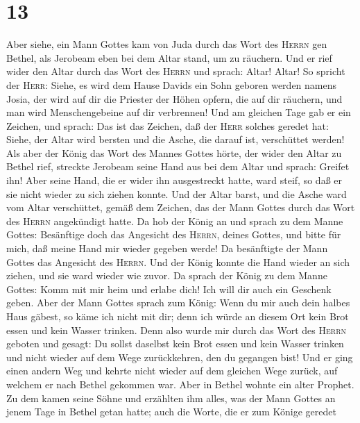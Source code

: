\hypertarget{section-12}{%
\section{13}\label{section-12}}

 Aber siehe, ein Mann Gottes kam von Juda durch das Wort
des \textsc{Herrn} gen Bethel, als Jerobeam eben bei dem Altar stand, um
zu räuchern.  Und er rief wider den Altar durch das Wort
des \textsc{Herrn} und sprach: Altar! Altar! So spricht der
\textsc{Herr}: Siehe, es wird dem Hause Davids ein Sohn geboren werden
namens Josia, der wird auf dir die Priester der Höhen opfern, die auf
dir räuchern, und man wird Menschengebeine auf dir verbrennen!
 Und am gleichen Tage gab er ein Zeichen, und sprach: Das
ist das Zeichen, daß der \textsc{Herr} solches geredet hat: Siehe, der
Altar wird bersten und die Asche, die darauf ist, verschüttet werden!
 Als aber der König das Wort des Mannes Gottes hörte, der
wider den Altar zu Bethel rief, streckte Jerobeam seine Hand aus bei dem
Altar und sprach: Greifet ihn! Aber seine Hand, die er wider ihn
ausgestreckt hatte, ward steif, so daß er sie nicht wieder zu sich
ziehen konnte.  Und der Altar barst, und die Asche ward
vom Altar verschüttet, gemäß dem Zeichen, das der Mann Gottes durch das
Wort des \textsc{Herrn} angekündigt hatte.  Da hob der
König an und sprach zu dem Manne Gottes: Besänftige doch das Angesicht
des \textsc{Herrn}, deines Gottes, und bitte für mich, daß meine Hand
mir wieder gegeben werde! Da besänftigte der Mann Gottes das Angesicht
des \textsc{Herrn}. Und der König konnte die Hand wieder an sich ziehen,
und sie ward wieder wie zuvor.  Da sprach der König zu dem
Manne Gottes: Komm mit mir heim und erlabe dich! Ich will dir auch ein
Geschenk geben.  Aber der Mann Gottes sprach zum König:
Wenn du mir auch dein halbes Haus gäbest, so käme ich nicht mit dir;
denn ich würde an diesem Ort kein Brot essen und kein Wasser trinken.
 Denn also wurde mir durch das Wort des \textsc{Herrn}
geboten und gesagt: Du sollst daselbst kein Brot essen und kein Wasser
trinken und nicht wieder auf dem Wege zurückkehren, den du gegangen
bist!  Und er ging einen andern Weg und kehrte nicht
wieder auf dem gleichen Wege zurück, auf welchem er nach Bethel gekommen
war.  Aber in Bethel wohnte ein alter Prophet. Zu dem
kamen seine Söhne und erzählten ihm alles, was der Mann Gottes an jenem
Tage in Bethel getan hatte; auch die Worte, die er zum Könige geredet
